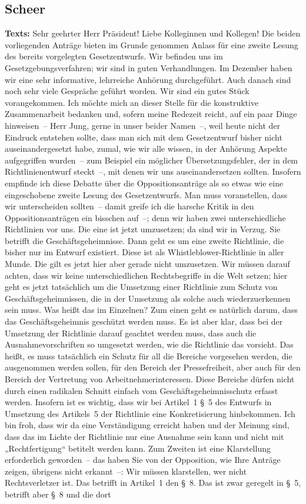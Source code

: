 \documentclass{article}
\begin{document}
\subsection{Scheer}
\noindent\textbf{Texts:} Sehr geehrter Herr Präsident! Liebe Kolleginnen und Kollegen! Die beiden vorliegenden Anträge bieten im Grunde genommen Anlass für eine zweite Lesung des bereits vorgelegten Gesetzentwurfs. Wir befinden uns im Gesetzgebungsverfahren; wir sind in guten Verhandlungen. Im Dezember haben wir eine sehr informative, lehrreiche Anhörung durchgeführt. Auch danach sind noch sehr viele Gespräche geführt worden. Wir sind ein gutes Stück vorangekommen. Ich möchte mich an dieser Stelle für die konstruktive Zusammenarbeit bedanken und, sofern meine Redezeit reicht, auf ein paar Dinge hinweisen – Herr Jung, gerne in unser beider Namen –, weil heute nicht der Eindruck entstehen sollte, dass man sich mit dem Gesetzentwurf bisher nicht auseinandergesetzt habe, zumal, wie wir alle wissen, in der Anhörung Aspekte aufgegriffen wurden – zum Beispiel ein möglicher Übersetzungsfehler, der in dem Richtlinienentwurf steckt –, mit denen wir uns auseinandersetzen sollten. Insofern empfinde ich diese Debatte über die Oppositionsanträge als so etwas wie eine eingeschobene zweite Lesung des Gesetzentwurfs. Man muss voranstellen, dass wir unterscheiden sollten – damit greife ich die harsche Kritik in den Oppositionsanträgen ein bisschen auf –; denn wir haben zwei unterschiedliche Richtlinien vor uns. Die eine ist jetzt umzusetzen; da sind wir in Verzug. Sie betrifft die Geschäftsgeheimnisse. Dann geht es um eine zweite Richtlinie, die bisher nur im Entwurf existiert. Diese ist als Whistleblower-Richtlinie in aller Munde. Die gilt es jetzt hier aber gerade nicht umzusetzen. Wir müssen darauf achten, dass wir keine unterschiedlichen Rechtsbegriffe in die Welt setzen; hier geht es jetzt tatsächlich um die Umsetzung einer Richtlinie zum Schutz von Geschäftsgeheimnissen, die in der Umsetzung als solche auch wiederzuerkennen sein muss. Was heißt das im Einzelnen? Zum einen geht es natürlich darum, dass das Geschäftsgeheimnis geschützt werden muss. Es ist aber klar, dass bei der Umsetzung der Richtlinie darauf geachtet werden muss, dass auch die Ausnahmevorschriften so umgesetzt werden, wie die Richtlinie das vorsieht. Das heißt, es muss tatsächlich ein Schutz für all die Bereiche vorgesehen werden, die ausgenommen werden sollen, für den Bereich der Pressefreiheit, aber auch für den Bereich der Vertretung von Arbeitnehmerinteressen. Diese Bereiche dürfen nicht durch einen radikalen Schnitt einfach vom Geschäftsgeheimnisschutz erfasst werden.  Insofern ist es wichtig, dass wir bei Artikel 1 § 5 des Entwurfs in Umsetzung des Artikels 5 der Richtlinie eine Konkretisierung hinbekommen. Ich bin froh, dass wir da eine Verständigung erreicht haben und der Meinung sind, dass das im Lichte der Richtlinie nur eine Ausnahme sein kann und nicht mit „Rechtfertigung“ betitelt werden kann.  Zum Zweiten ist eine Klarstellung erforderlich geworden – das haben Sie von der Opposition, wie Ihre Anträge zeigen, übrigens nicht erkannt –: Wir müssen klarstellen, wer nicht Rechtsverletzer ist. Das betrifft in Artikel 1 den § 8. Das ist zwar geregelt in § 5, betrifft aber § 8 und die dort 
\end{document}
